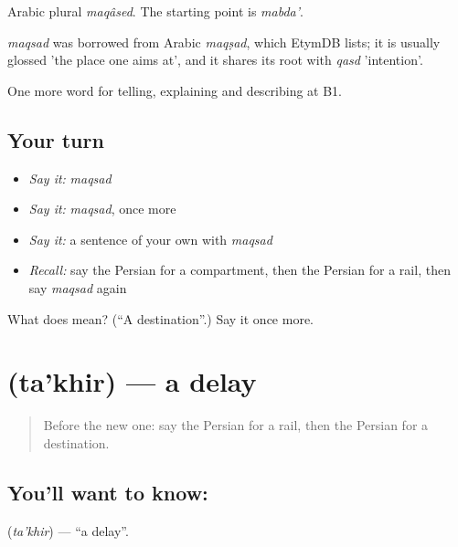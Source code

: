 Arabic plural \emph{maqâsed}. The starting point is \emph{mabda'}.

\begin{cousinweb}
\emph{maqsad} was borrowed from Arabic \emph{maqṣad}, which EtymDB lists; it is usually glossed 'the place one aims at', and it shares its root with \emph{qasd} 'intention'.
\end{cousinweb}

\begin{grammarlens}[title={What you've built}]
One more word for telling, explaining and describing at B1.
\end{grammarlens}

\subsection*{Your turn}
\begin{itemize}
\raggedright
  \item \emph{Say it:} \emph{maqsad}
  \item \emph{Say it:} \emph{maqsad}, once more
  \item \emph{Say it:} a sentence of your own with \emph{maqsad}
  \item \emph{Recall:} say the Persian for a compartment, then the Persian for a rail, then say \emph{maqsad} again
\end{itemize}

\begin{tcolorbox}[breakable,colback=teal!4,colframe=teal!35!black,title={Before you move on}]
What does  mean? (\textquotedblleft{}A destination\textquotedblright{}.) Say it once more.
\end{tcolorbox}
\section[\texorpdfstring{\fa{تاخیر} (ta'khir)}{تاخیر (ta'khir)}]{ (ta'khir) — a delay}

\label{lesson:FA-C430-takhir}



\begin{quote}
Before the new one: say the Persian for a rail, then the Persian for a destination.
\end{quote}

\subsection*{You'll want to know: }
\textbf{} (\emph{ta'khir}) — \textquotedblleft{}a delay\textquotedblright{}.

